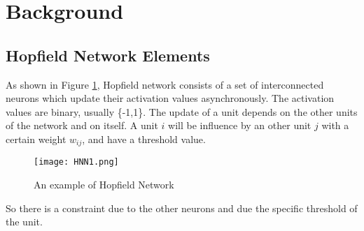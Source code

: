 \section{Background}
\subsection{Hopfield Network Elements}
As shown in Figure \ref{fg:HNN1}, Hopfield network consists of a set of interconnected neurons which update their activation values asynchronously. The activation values are binary, usually \{-1,1\}. The update of a unit depends on the other units of the network and on itself. A unit $i$ will be influence by an other unit $j$ with a certain weight $w_{ij}$, and have a threshold value.\\

\begin{figure}[h]
\centering
\texttt{[image: HNN1.png]}
\caption{An example of Hopfield Network}
\label{fg:HNN1}
\end{figure}

So there is a constraint due to the other neurons and due the specific threshold of the unit.\\

